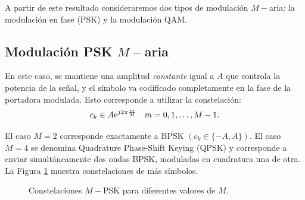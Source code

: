 A partir de este resultado consideraremos dos tipos de modulación $M-$aria: la modulación en fase (PSK) y la modulación QAM.

\subsection{Modulación PSK $M-$aria}

En este caso, se mantiene una amplitud \emph{constante} igual a $A$ que controla la potencia de la señal, y el símbolo va codificado completamente en la fase de la portadora modulada. Esto corresponde a utilizar la constelación:
\begin{equation}\label{eq:constelacion psk}
c_k \in A \mathrm{e}^{j2\pi \frac{m}{M}} \quad m=0,1,\ldots,M-1.    
\end{equation}

El caso $M=2$ corresponde exactamente a BPSK $(c_k\in \{-A,A\})$. El caso $M=4$ se denomina Quadrature Phase-Shift Keying (QPSK) y corresponde a enviar simultáneamente dos ondas BPSK, moduladas en cuadratura una de otra. La Figura \ref{fig:mpsk} muestra constelaciones de más símbolos.

\begin{figure}
    \begin{center}
    \hspace{1cm}
    \hspace{1cm}
    \end{center}
    \caption{Constelaciones $M-$PSK para diferentes valores de $M$.}\label{fig:mpsk}
\end{figure}

